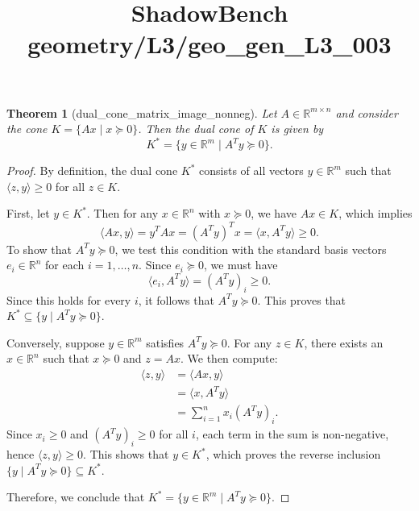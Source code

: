 \documentclass{article}
\title{ShadowBench geometry/L3/geo\_gen\_L3\_003}
\newtheorem{theorem}{Theorem}
\begin{document}
\maketitle

\begin{theorem}[dual_cone_matrix_image_nonneg]
Let $A \in \mathbb{R}^{m \times n}$ and consider the cone $K = \{Ax \mid x \succeq 0\}$. Then the dual cone of $K$ is given by
\[
K^* = \{y \in \mathbb{R}^m \mid A^T y \succeq 0\}.
\]
\end{theorem}

\begin{proof}
By definition, the dual cone $K^*$ consists of all vectors $y \in \mathbb{R}^m$ such that $\langle z, y \rangle \ge 0$ for all $z \in K$. 

First, let $y \in K^*$. Then for any $x \in \mathbb{R}^n$ with $x \succeq 0$, we have $Ax \in K$, which implies
\[
\langle Ax, y \rangle = y^T Ax = (A^T y)^T x = \langle x, A^T y \rangle \ge 0.
\]
To show that $A^T y \succeq 0$, we test this condition with the standard basis vectors $e_i \in \mathbb{R}^n$ for each $i = 1, \dots, n$. Since $e_i \succeq 0$, we must have
\[
\langle e_i, A^T y \rangle = (A^T y)_i \ge 0.
\]
Since this holds for every $i$, it follows that $A^T y \succeq 0$. This proves that $K^* \subseteq \{y \mid A^T y \succeq 0\}$.

Conversely, suppose $y \in \mathbb{R}^m$ satisfies $A^T y \succeq 0$. For any $z \in K$, there exists an $x \in \mathbb{R}^n$ such that $x \succeq 0$ and $z = Ax$. We then compute:
\begin{align*}
\langle z, y \rangle &= \langle Ax, y \rangle \\
&= \langle x, A^T y \rangle \\
&= \sum_{i=1}^n x_i (A^T y)_i.
\end{align*}
Since $x_i \ge 0$ and $(A^T y)_i \ge 0$ for all $i$, each term in the sum is non-negative, hence $\langle z, y \rangle \ge 0$. This shows that $y \in K^*$, which proves the reverse inclusion $\{y \mid A^T y \succeq 0\} \subseteq K^*$.

Therefore, we conclude that $K^* = \{y \in \mathbb{R}^m \mid A^T y \succeq 0\}$.
\end{proof}
\end{document}
